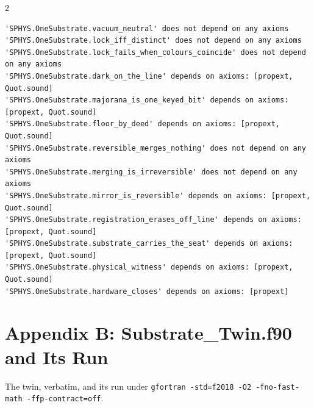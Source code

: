 \documentclass[10pt]{article}
\begin{document}
\begin{multicols}{2}
\begin{Verbatim}[fontsize=\fontsize{6.2}{7.2}\selectfont,breaklines,breakanywhere,breaksymbolleft={}]
'SPHYS.OneSubstrate.vacuum_neutral' does not depend on any axioms
'SPHYS.OneSubstrate.lock_iff_distinct' does not depend on any axioms
'SPHYS.OneSubstrate.lock_fails_when_colours_coincide' does not depend on any axioms
'SPHYS.OneSubstrate.dark_on_the_line' depends on axioms: [propext, Quot.sound]
'SPHYS.OneSubstrate.majorana_is_one_keyed_bit' depends on axioms: [propext, Quot.sound]
'SPHYS.OneSubstrate.floor_by_deed' depends on axioms: [propext, Quot.sound]
'SPHYS.OneSubstrate.reversible_merges_nothing' does not depend on any axioms
'SPHYS.OneSubstrate.merging_is_irreversible' does not depend on any axioms
'SPHYS.OneSubstrate.mirror_is_reversible' depends on axioms: [propext, Quot.sound]
'SPHYS.OneSubstrate.registration_erases_off_line' depends on axioms: [propext, Quot.sound]
'SPHYS.OneSubstrate.substrate_carries_the_seat' depends on axioms: [propext, Quot.sound]
'SPHYS.OneSubstrate.physical_witness' depends on axioms: [propext, Quot.sound]
'SPHYS.OneSubstrate.hardware_closes' depends on axioms: [propext]
\end{Verbatim}
\end{multicols}

\hypertarget{appendix-b-substrate_twin.f90-and-its-run}{%
\section{Appendix B: Substrate\_Twin.f90 and Its
Run}\label{appendix-b-substrate_twin.f90-and-its-run}}

The twin, verbatim, and its run under
\texttt{gfortran\ -std=f2018\ -O2\ -fno-fast-math\ -ffp-contract=off}.
\end{document}
